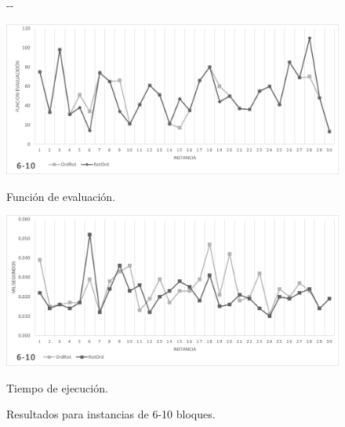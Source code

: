 \documentclass[letter, 10pt]{article}
\begin{document}
\begin{figure}[H]
    \begin{adjustwidth}{-\marginparwidth}{-\marginparwidth}
        \centering
        \begin{minipage}{.5\linewidth}
            \centering
            \includegraphics[width=\linewidth]{./img/6-10.png}
            \caption*{Función de evaluación.}
            \label{fig:6-10_g}
        \end{minipage}%
        \begin{minipage}{.5\linewidth}
            \centering
            \includegraphics[width=\linewidth]{./img/6-10_t.png}
            \caption*{Tiempo de ejecución.}
            \label{fig:6-10_t}
        \end{minipage}
    \end{adjustwidth}
    \caption{Resultados para instancias de 6-10 bloques.}
    \label{fig:6-10}
\end{figure}

\newpage
\end{document}
